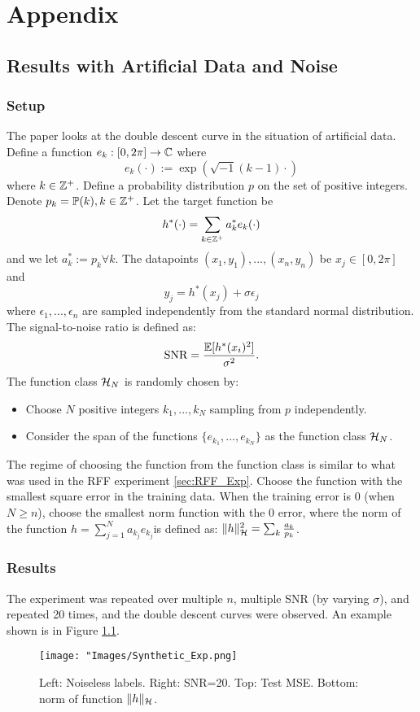 \documentclass[twoside]{memoir}
\begin{document}
\chapter{Appendix} \label{chpt:Appendix}
\section{Results with Artificial Data and Noise} \label{sec:AritificialData}
\subsection{Setup}
The paper looks at the double descent curve in the situation of artificial data. Define a function $e_k: [0, 2\pi] \rightarrow \mathbb{C}$ where
\[ e_k(\cdot) := \exp(\sqrt{-1}(k - 1) \cdot) \]
where $k \in \mathbb{Z}^+$. Define a probability distribution $p$ on the set of positive integers. Denote $p_k = \mathbb{P}(k), k \in \mathbb{Z}^+$.
Let the target function be
\[ h^*(\cdot) = \sum_{k \in \mathbb{Z}^+} a^*_k e_k(\cdot)\]
and we let $a_k^* := p_k \forall k$. The datapoints $(x_1, y_1), ..., (x_n, y_n)$ be $x_j \in [0, 2\pi]$ and 
\[ y_j = h^*(x_j) + \sigma\epsilon_j \]
where $\epsilon_1,..., \epsilon_n$ are sampled independently from the standard normal distribution.\\
The signal-to-noise ratio is defined as:
\[ \text{SNR} = \frac{\mathbb{E}[h^*(x_i)^2]}{\sigma^2}. \]
The function class $\mathcal{H}_N$ is randomly chosen by:
\begin{itemize}
	\item Choose $N$ positive integers $k_1,..., k_N$ sampling from $p$ independently.
	\item Consider the span of the functions $\{ e_{k_1},..., e_{k_N} \}$ as the function class $\mathcal{H}_N$.
\end{itemize}
The regime of choosing the function from the function class is similar to what was used in the RFF experiment \ref{sec:RFF_Exp}. Choose the function with the smallest square error in the training data. When the training error is 0 (when $N \geq n$), choose the smallest norm function with the 0 error, where the norm of the function $h = \sum_{j=1}^{N} a_{k_j} e_{k_j} $is defined as: $\lVert h\rVert^2_{\mathcal{H}} = \sum_{k}\frac{a_k}{p_k}$.
\subsection{Results}
The experiment was repeated over multiple $n$, multiple SNR (by varying $\sigma$), and repeated 20 times, and the double descent curves were observed. An example shown is in Figure \ref{fig:Synthetic_Exp}.
\begin{figure}
	\centering
	\texttt{[image: "Images/Synthetic\_Exp.png]}
	\par
	\caption{Left: Noiseless labels. Right: SNR=20. Top: Test MSE. Bottom: norm of function $\lVert h\rVert_{\mathcal{H}}$.} \label{fig:Synthetic_Exp}
\end{figure}
\end{document}

